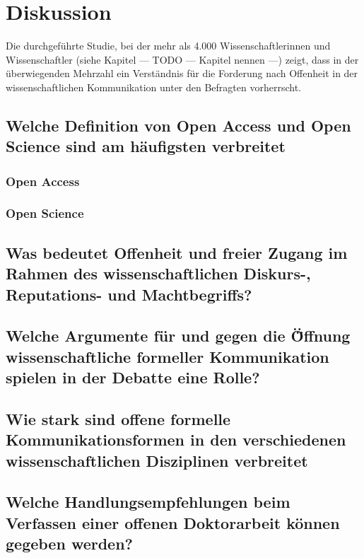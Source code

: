 \chapter{Diskussion}

Die durchgeführte Studie, bei der mehr als 4.000 Wissenschaftlerinnen und Wissenschaftler (siehe Kapitel --- TODO --- Kapitel nennen ---) zeigt, dass in der überwiegenden Mehrzahl ein Verständnis für die Forderung nach Offenheit in der wissenschaftlichen Kommunikation unter den Befragten vorherrscht.

\section{Welche Definition von Open Access und Open Science sind am häufigsten verbreitet}  
\subsection{Open Access}  
\subsection{Open Science}  

\section{Was bedeutet Offenheit und freier Zugang im Rahmen des wissenschaftlichen Diskurs-, Reputations- und Machtbegriffs?} 

\section{Welche Argumente für und gegen die Ö̈ffnung wissenschaftliche formeller Kommunikation spielen in der Debatte eine Rolle?} 

\section{Wie stark sind offene formelle Kommunikationsformen in den verschiedenen wissenschaftlichen Disziplinen verbreitet}  
 
\section{Welche Handlungsempfehlungen beim Verfassen einer offenen Doktorarbeit können gegeben werden?} 